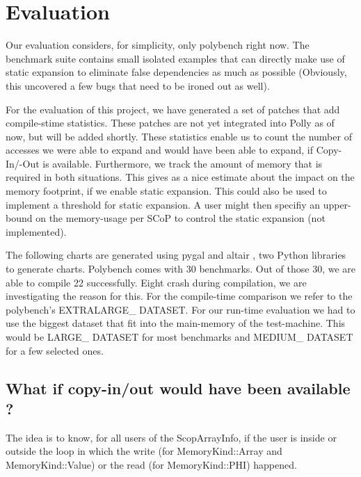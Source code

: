\chapter{Evaluation}\label{ch:Evaluation}

Our evaluation considers, for simplicity, only polybench right now. The benchmark suite contains small isolated examples that can directly make use of static expansion to eliminate false dependencies as much as possible (Obviously, this uncovered a few bugs that need to be ironed out as well).

For the evaluation of this project, we have generated a set of patches that add compile-stime statistics. These patches are not yet integrated into Polly as of now, but will be added shortly. These statistics enable us to count the number of accesses we were able to expand and would have been able to expand, if Copy-In/-Out is available. Furthermore, we track the amount of memory that is required in both situations. This gives as a nice estimate about the impact on the memory footprint, if we enable static expansion. This could also be used to implement a threshold for static expansion. A user might then specifiy an upper-bound on the memory-usage per SCoP to control the static expansion (not implemented).

The following charts are generated using pygal and altair , two Python libraries to generate charts. Polybench comes with 30 benchmarks. Out of those 30, we are able to compile 22 successfully. Eight crash during compilation, we are investigating the reason for this. For the compile-time comparison we refer to the polybench’s EXTRALARGE\_ DATASET. For our run-time evaluation we had to use the biggest dataset that fit into the main-memory of the test-machine. This would be LARGE\_ DATASET for most benchmarks and MEDIUM\_ DATASET for a few selected ones.


\section{What if copy-in/out would have been available ?}
The idea is to know, for all users of the ScopArrayInfo, if the user is inside or outside the loop in which the write (for MemoryKind::Array and MemoryKind::Value) or the read (for MemoryKind::PHI) happened.

